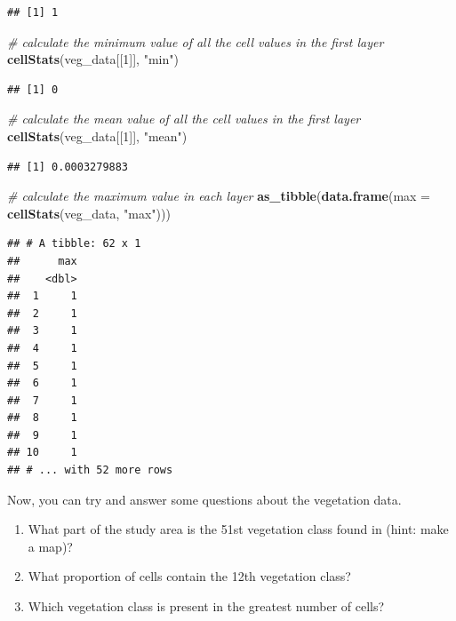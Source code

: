 \documentclass[12pt,]{book}
\newenvironment{Shaded}{\begin{snugshade}}{\end{snugshade}}
\newcommand{\KeywordTok}[1]{\textcolor[rgb]{0.13,0.29,0.53}{\textbf{#1}}}
\newcommand{\DataTypeTok}[1]{\textcolor[rgb]{0.13,0.29,0.53}{#1}}
\newcommand{\DecValTok}[1]{\textcolor[rgb]{0.00,0.00,0.81}{#1}}
\newcommand{\StringTok}[1]{\textcolor[rgb]{0.31,0.60,0.02}{#1}}
\newcommand{\CommentTok}[1]{\textcolor[rgb]{0.56,0.35,0.01}{\textit{#1}}}
\newcommand{\NormalTok}[1]{#1}
\providecommand{\tightlist}{%
  \setlength{\itemsep}{0pt}\setlength{\parskip}{0pt}}
\let\BeginKnitrBlock\begin \let\EndKnitrBlock\end
\begin{document}
\begin{verbatim}
## [1] 1
\end{verbatim}

\begin{Shaded}
\begin{Highlighting}[]
\CommentTok{# calculate the minimum value of all the cell values in the first layer}
\KeywordTok{cellStats}\NormalTok{(veg_data[[}\DecValTok{1}\NormalTok{]], }\StringTok{"min"}\NormalTok{)}
\end{Highlighting}
\end{Shaded}

\begin{verbatim}
## [1] 0
\end{verbatim}

\begin{Shaded}
\begin{Highlighting}[]
\CommentTok{# calculate the mean value of all the cell values in the first layer}
\KeywordTok{cellStats}\NormalTok{(veg_data[[}\DecValTok{1}\NormalTok{]], }\StringTok{"mean"}\NormalTok{)}
\end{Highlighting}
\end{Shaded}

\begin{verbatim}
## [1] 0.0003279883
\end{verbatim}

\clearpage

\begin{Shaded}
\begin{Highlighting}[]
\CommentTok{# calculate the maximum value in each layer}
\KeywordTok{as_tibble}\NormalTok{(}\KeywordTok{data.frame}\NormalTok{(}\DataTypeTok{max =} \KeywordTok{cellStats}\NormalTok{(veg_data, }\StringTok{"max"}\NormalTok{)))}
\end{Highlighting}
\end{Shaded}

\begin{verbatim}
## # A tibble: 62 x 1
##      max
##    <dbl>
##  1     1
##  2     1
##  3     1
##  4     1
##  5     1
##  6     1
##  7     1
##  8     1
##  9     1
## 10     1
## # ... with 52 more rows
\end{verbatim}

Now, you can try and answer some questions about the vegetation data.

\BeginKnitrBlock{rmdquestion}
\begin{enumerate}
\def\labelenumi{\arabic{enumi}.}
\tightlist
\item
  What part of the study area is the 51st vegetation class found in
  (hint: make a map)?
\item
  What proportion of cells contain the 12th vegetation class?
\item
  Which vegetation class is present in the greatest number of cells?
\end{enumerate}
\EndKnitrBlock{rmdquestion}
\end{document}
